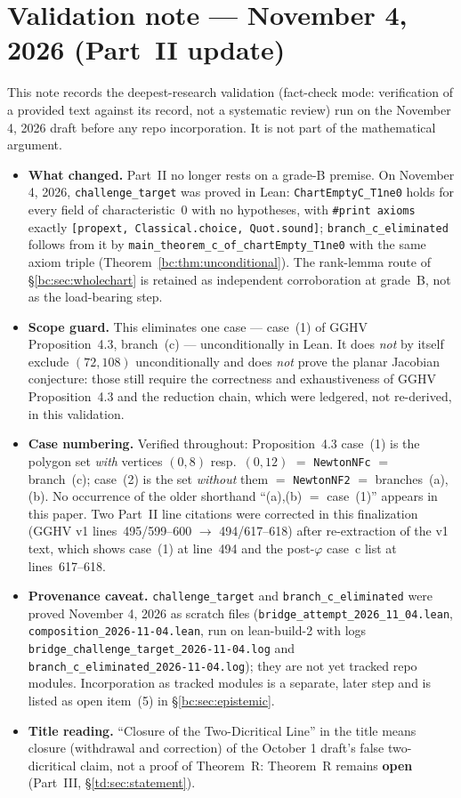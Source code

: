 \documentclass[a4paper,11pt]{article}
\theoremstyle{plain}
\theoremstyle{definition}
\theoremstyle{remark}
\begin{document}
\section*{Validation note --- November 4, 2026 (Part~II update)}
This note records the deepest-research validation (fact-check mode: verification of a provided text against its record, not a systematic review) run on the November 4, 2026 draft before any repo incorporation. It is not part of the mathematical argument.
\begin{itemize}[nosep]
\item \textbf{What changed.} Part~II no longer rests on a grade-B premise. On November 4, 2026, \texttt{challenge\_target} was proved in Lean: \texttt{ChartEmptyC\_T1ne0} holds for every field of characteristic~$0$ with no hypotheses, with \texttt{\#print axioms} exactly \texttt{[propext, Classical.choice, Quot.sound]}; \texttt{branch\_c\_eliminated} follows from it by \texttt{main\_theorem\_c\_of\_chartEmpty\_T1ne0} with the same axiom triple (Theorem~\ref{bc:thm:unconditional}). The rank-lemma route of \S\ref{bc:sec:wholechart} is retained as independent corroboration at grade~B, not as the load-bearing step.
\item \textbf{Scope guard.} This eliminates one case --- case~(1) of GGHV Proposition~4.3, branch~(c) --- unconditionally in Lean. It does \emph{not} by itself exclude $(72,108)$ unconditionally and does \emph{not} prove the planar Jacobian conjecture: those still require the correctness and exhaustiveness of GGHV Proposition~4.3 and the reduction chain, which were ledgered, not re-derived, in this validation.
\item \textbf{Case numbering.} Verified throughout: Proposition~4.3 case~(1) is the polygon set \emph{with} vertices $(0,8)$ resp.\ $(0,12)$ $=$ \texttt{NewtonNFc} $=$ branch~(c); case~(2) is the set \emph{without} them $=$ \texttt{NewtonNF2} $=$ branches~(a),(b). No occurrence of the older shorthand ``(a),(b) $=$ case~(1)'' appears in this paper. Two Part~II line citations were corrected in this finalization (GGHV v1 lines~495/599--600 $\to$ 494/617--618) after re-extraction of the v1 text, which shows case~(1) at line~494 and the post-$\varphi$ case~c list at lines~617--618.
\item \textbf{Provenance caveat.} \texttt{challenge\_target} and \texttt{branch\_c\_eliminated} were proved November 4, 2026 as scratch files (\texttt{bridge\_attempt\_2026\_11\_04.lean}, \texttt{composition\_2026-11-04.lean}, run on lean-build-2 with logs \texttt{bridge\_challenge\_target\_2026-11-04.log} and \texttt{branch\_c\_eliminated\_2026-11-04.log}); they are not yet tracked repo modules. Incorporation as tracked modules is a separate, later step and is listed as open item~(5) in \S\ref{bc:sec:epistemic}.
\item \textbf{Title reading.} ``Closure of the Two-Dicritical Line'' in the title means closure (withdrawal and correction) of the October 1 draft's false two-dicritical claim, not a proof of Theorem~R: Theorem~R remains \textbf{open} (Part~III, \S\ref{td:sec:statement}).
\end{itemize}
\end{document}
